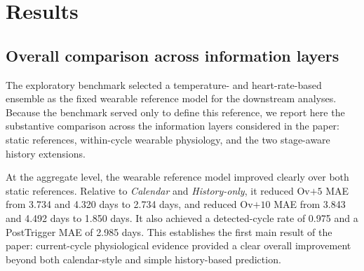 \documentclass[conference]{IEEEtran}
\begin{document}
\section{Results}

\subsection{Overall comparison across information layers}

The exploratory benchmark selected a temperature- and heart-rate-based ensemble as the fixed wearable reference model for the downstream analyses. Because the benchmark served only to define this reference, we report here the substantive comparison across the information layers considered in the paper: static references, within-cycle wearable physiology, and the two stage-aware history extensions.

\begin{table}[t]
\caption{\normalfont Overall comparison across static references, wearable physiology, and stage-aware history extensions on 79 labelled cycles. Values are MAE in days with 95\% bootstrap CIs.}
\label{tab:overall_layers}
\centering
\scriptsize
{}
\end{table}

At the aggregate level, the wearable reference model improved clearly over both static references. Relative to \textit{Calendar} and \textit{History-only}, it reduced Ov$+5$ MAE from 3.734 and 4.320 days to 2.734 days, and reduced Ov$+10$ MAE from 3.843 and 4.492 days to 1.850 days. It also achieved a detected-cycle rate of 0.975 and a PostTrigger MAE of 2.985 days. This establishes the first main result of the paper: current-cycle physiological evidence provided a clear overall improvement beyond both calendar-style and simple history-based prediction.
\end{document}

